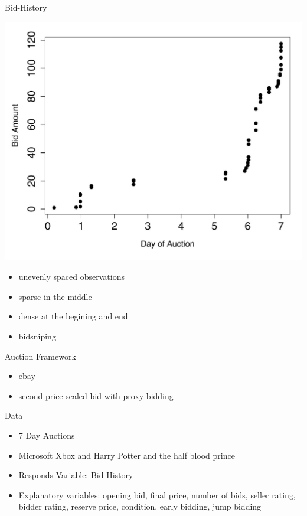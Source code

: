 \documentclass[hyperref={pdfpagelabels=false}]{beamer}
\begin{document}
\begin{frame}{Bid-History} %
\begin{minipage}[c]{0.6\textwidth}
\includegraphics[width=\textwidth]{bid_history}
\end{minipage}
\hfill
\begin{minipage}[c]{0.3\textwidth}
\begin{itemize}
\item unevenly spaced observations
\item sparse in the middle
\item dense at the begining and end
\item bidsniping
\end{itemize}
\end{minipage}
\end{frame}

\begin{frame}{Auction Framework} %
\begin{itemize}
	\item ebay
	\item second price sealed bid with proxy bidding
\end{itemize}
Data
\begin{itemize}
	\item 7 Day Auctions
	\item Microsoft Xbox and Harry Potter and the half blood prince
	\item Responds Variable: Bid History
	\item Explanatory variables: opening bid, final price, number of bids, seller rating, bidder rating, reserve price, condition, early bidding, jump bidding
\end{itemize}
\end{frame}
\end{document}
